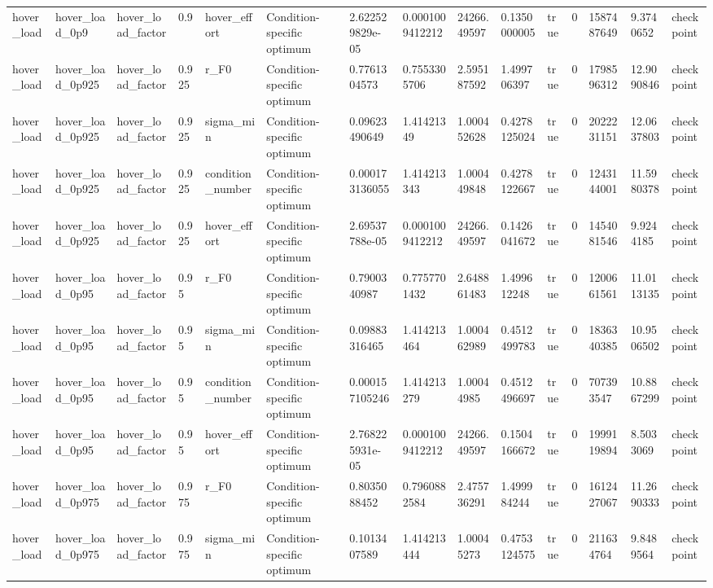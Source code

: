 \begin{tabular}{@{}lllllllllllllll@{}}
hover\_load & hover\_load\_0p9 & hover\_load\_factor & 0.9 & hover\_effort & Condition-specific optimum & 2.622529829e-05 & 0.0001009412212 & 24266.49597 & 0.1350000005 & true & 0 & 1587487649 & 9.3740652 & checkpoint \\
hover\_load & hover\_load\_0p925 & hover\_load\_factor & 0.925 & r\_F0 & Condition-specific optimum & 0.7761304573 & 0.7553305706 & 2.595187592 & 1.499706397 & true & 0 & 1798596312 & 12.9090846 & checkpoint \\
hover\_load & hover\_load\_0p925 & hover\_load\_factor & 0.925 & sigma\_min & Condition-specific optimum & 0.09623490649 & 1.41421349 & 1.000452628 & 0.4278125024 & true & 0 & 2022231151 & 12.0637803 & checkpoint \\
hover\_load & hover\_load\_0p925 & hover\_load\_factor & 0.925 & condition\_number & Condition-specific optimum & 0.000173136055 & 1.414213343 & 1.000449848 & 0.4278122667 & true & 0 & 1243144001 & 11.5980378 & checkpoint \\
hover\_load & hover\_load\_0p925 & hover\_load\_factor & 0.925 & hover\_effort & Condition-specific optimum & 2.69537788e-05 & 0.0001009412212 & 24266.49597 & 0.1426041672 & true & 0 & 1454081546 & 9.9244185 & checkpoint \\
hover\_load & hover\_load\_0p95 & hover\_load\_factor & 0.95 & r\_F0 & Condition-specific optimum & 0.7900340987 & 0.7757701432 & 2.648861483 & 1.499612248 & true & 0 & 1200661561 & 11.0113135 & checkpoint \\
hover\_load & hover\_load\_0p95 & hover\_load\_factor & 0.95 & sigma\_min & Condition-specific optimum & 0.09883316465 & 1.414213464 & 1.000462989 & 0.4512499783 & true & 0 & 1836340385 & 10.9506502 & checkpoint \\
hover\_load & hover\_load\_0p95 & hover\_load\_factor & 0.95 & condition\_number & Condition-specific optimum & 0.000157105246 & 1.414213279 & 1.00044985 & 0.4512496697 & true & 0 & 707393547 & 10.8867299 & checkpoint \\
hover\_load & hover\_load\_0p95 & hover\_load\_factor & 0.95 & hover\_effort & Condition-specific optimum & 2.768225931e-05 & 0.0001009412212 & 24266.49597 & 0.1504166672 & true & 0 & 1999119894 & 8.5033069 & checkpoint \\
hover\_load & hover\_load\_0p975 & hover\_load\_factor & 0.975 & r\_F0 & Condition-specific optimum & 0.8035088452 & 0.7960882584 & 2.475736291 & 1.499984244 & true & 0 & 1612427067 & 11.2690333 & checkpoint \\
hover\_load & hover\_load\_0p975 & hover\_load\_factor & 0.975 & sigma\_min & Condition-specific optimum & 0.1013407589 & 1.414213444 & 1.00045273 & 0.4753124575 & true & 0 & 211634764 & 9.8489564 & checkpoint \\

\end{tabular}
